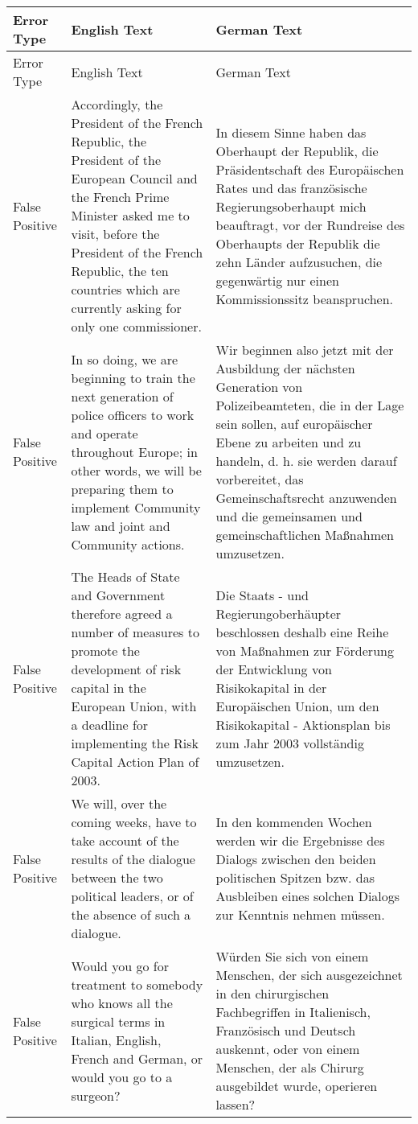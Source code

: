 \begin{longtable}{|l|p{6cm}|p{6cm}|}
\hline
Error Type & English Text & German Text \\
\hline
\endfirsthead
\hline
Error Type & English Text & German Text \\
\hline
\endhead
False Positive & Accordingly, the President of the French Republic, the President of the European Council and the French Prime Minister asked me to visit, before the President of the French Republic, the ten countries which are currently asking for only one commissioner. & In diesem Sinne haben das Oberhaupt der Republik, die Präsidentschaft des Europäischen Rates und das französische Regierungsoberhaupt mich beauftragt, vor der Rundreise des Oberhaupts der Republik die zehn Länder aufzusuchen, die gegenwärtig nur einen Kommissionssitz beanspruchen. \\
False Positive & In so doing, we are beginning to train the next generation of police officers to work and operate throughout Europe; in other words, we will be preparing them to implement Community law and joint and Community actions. & Wir beginnen also jetzt mit der Ausbildung der nächsten Generation von Polizeibeamteten, die in der Lage sein sollen, auf europäischer Ebene zu arbeiten und zu handeln, d. h. sie werden darauf vorbereitet, das Gemeinschaftsrecht anzuwenden und die gemeinsamen und gemeinschaftlichen Maßnahmen umzusetzen. \\
False Positive & The Heads of State and Government therefore agreed a number of measures to promote the development of risk capital in the European Union, with a deadline for implementing the Risk Capital Action Plan of 2003. & Die Staats - und Regierungoberhäupter beschlossen deshalb eine Reihe von Maßnahmen zur Förderung der Entwicklung von Risikokapital in der Europäischen Union, um den Risikokapital - Aktionsplan bis zum Jahr 2003 vollständig umzusetzen. \\
False Positive & We will, over the coming weeks, have to take account of the results of the dialogue between the two political leaders, or of the absence of such a dialogue. & In den kommenden Wochen werden wir die Ergebnisse des Dialogs zwischen den beiden politischen Spitzen bzw. das Ausbleiben eines solchen Dialogs zur Kenntnis nehmen müssen. \\
False Positive & Would you go for treatment to somebody who knows all the surgical terms in Italian, English, French and German, or would you go to a surgeon? & Würden Sie sich von einem Menschen, der sich ausgezeichnet in den chirurgischen Fachbegriffen in Italienisch, Französisch und Deutsch auskennt, oder von einem Menschen, der als Chirurg ausgebildet wurde, operieren lassen? \\

\end{longtable}
